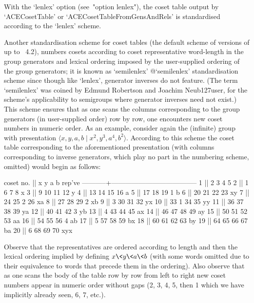 With the `lenlex' option (see~"option lenlex"), the coset table output
by `ACECosetTable' or `ACECosetTableFromGensAndRels'  is  standardised
according to the `lenlex' scheme.

Another standardisation scheme for coset tables (the default scheme of
versions of {\GAP} up to  {\GAP}~4.2),  numbers  cosets  according  to
coset representative word-length in the group generators  and  lexical
ordering  imposed  by  the  user-supplied  ordering   of   the   group
generators; it is known as `semilenlex'{\undoquotes{} {@`semilenlex' standardisation scheme}}  since
though like `lenlex', generator inverses do  not  feature.  (The  term
`semilenlex'   was   coined   by   Edmund   Robertson   and    Joachim
Neub{\accent127u}ser, for the  scheme's  applicability  to  semigroups
where generator inverses need not exist.) This scheme ensures that  as
one scans the  columns  corresponding  to  the  group  generators  (in
user-supplied order) row by row, one encounters new coset  numbers  in
numeric order. As an example, consider again the (infinite) group with
presentation $\langle x, y, a, b  \mid  x^2,  y^3,  a^4,  b^2\rangle$.
According  to  this  scheme  the  coset  table  corresponding  to  the
aforementioned presentation (with  columns  corresponding  to  inverse
generators, which play no part in the numbering scheme, omitted) would
begin as follows:

\begintt
 coset no. ||      x      y      a      b    rep've
-----------+--------------------------------------
         1 ||      2      3      4      5
         2 ||      1      6      7      8    x
         3 ||      9     10     11     12    y
         4 ||     13     14     15     16    a
         5 ||     17     18     19      1    b
         6 ||     20     21     22     23    xy
         7 ||     24     25      2     26    xa
         8 ||     27     28     29      2    xb
         9 ||      3     30     31     32    yx
        10 ||     33      1     34     35    yy
        11 ||     36     37     38     39    ya
        12 ||     40     41     42      3    yb
        13 ||      4     43     44     45    ax
        14 ||     46     47     48     49    ay
        15 ||     50     51     52     53    aa
        16 ||     54     55     56      4    ab
        17 ||      5     57     58     59    bx
        18 ||     60     61     62     63    by
        19 ||     64     65     66     67    ba
        20 ||      6     68     69     70    xyx
\endtt

Observe that the representatives are ordered according to  length  and
then the lexical ordering implied by defining $x\<y\<a\<b$ (with  some
words omitted due to their equivalence to words that precede  them  in
the ordering). Also observe that as one scans the body  of  the  table
row by row from left to right new  coset  numbers  appear  in  numeric
order without gaps (2, 3, 4,  5,  then  1  which  we  have  implicitly
already seen, 6, 7, etc.).

